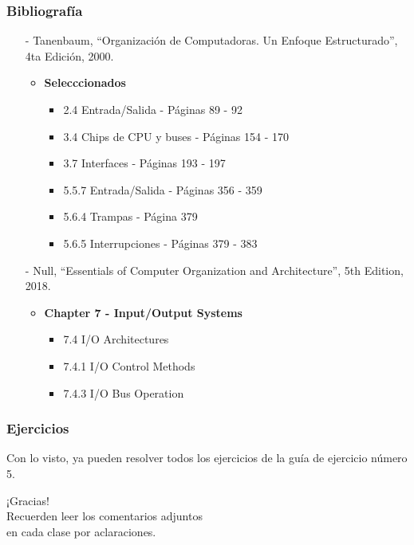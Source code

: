 \documentclass[aspectratio=169]{beamer}
\begin{document}
\begin{frame}[fragile]
    \frametitle{Bibliografía}
    \begin{itemize}
     \setlength\itemsep{0.5cm}
    \item[-] \small Tanenbaum, “Organización de Computadoras. Un Enfoque Estructurado”, 4ta Edición, 2000.\\
    \begin{itemize}
     \item \textbf{Selecccionados}\\
     \begin{itemize}
      \item 2.4 Entrada/Salida - Páginas 89 - 92
      \item 3.4 Chips de CPU y buses - Páginas 154 - 170
      \item 3.7 Interfaces - Páginas 193 - 197
      \item 5.5.7 Entrada/Salida - Páginas 356 - 359
      \item 5.6.4 Trampas - Página 379
      \item 5.6.5 Interrupciones - Páginas 379 - 383
     \end{itemize}
    \end{itemize}
    \item[-] \small Null, “Essentials of Computer Organization and Architecture”, 5th Edition, 2018.\\
    \begin{itemize}
    \item \textbf{Chapter 7 - Input/Output Systems}    
     \begin{itemize}
        \item 7.4 I/O Architectures
        \item 7.4.1 I/O Control Methods
        \item 7.4.3 I/O Bus Operation
     \end{itemize}
    \end{itemize}
    \end{itemize}
\end{frame}

\begin{frame}[fragile]
    \frametitle{Ejercicios}
    Con lo visto, ya pueden resolver todos los ejercicios de la guía de ejercicio número 5.
\end{frame}

\begin{frame}[plain]
    \begin{center}
    \vspace{2cm}
    \huge ¡Gracias!\\
    \vspace{2cm}
    \normalsize Recuerden leer los comentarios adjuntos\\ en cada clase por aclaraciones.
    \end{center}
\end{frame}
\end{document}
